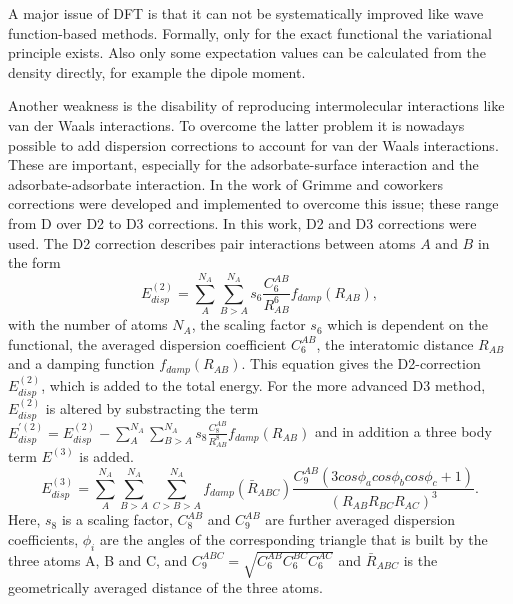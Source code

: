 \documentclass[11pt,DIV=13,BCOR=5mm,a4paper,headinclude]{scrbook}
\begin{document}
A major issue of DFT is that it can not be systematically improved like wave function-based methods.
Formally, only for the exact functional the variational principle exists.
Also only some expectation values can be calculated from the density directly, for example the dipole moment. %


Another weakness is the disability of reproducing intermolecular interactions like van der Waals interactions.
To overcome the latter problem it is nowadays possible to add dispersion corrections to account for van der Waals interactions.
These are important, especially for the adsorbate-surface interaction and the adsorbate-adsorbate interaction.
In the work of Grimme\cite{grimme06} and coworkers corrections were developed and implemented to overcome this issue; these range from D over D2 to D3 corrections.
In this work, D2 and D3 corrections were used.
The D2 correction describes pair interactions between atoms $A$ and $B$ in the form
\begin{equation}\label{eq:d2}
 E_{disp}^{(2)} =\sum\limits_{A}^{N_A}\sum\limits_{B>A}^{N_A} s_6 \frac{C_6^{AB}}{R_{AB}^6}f_{damp}(R_{AB}),
\end{equation}
with the number of atoms $N_A$, the scaling factor $s_6$ which is dependent on the functional, the averaged dispersion coefficient $C^{AB}_6$, the interatomic distance $R_{AB}$ and a damping function $f_{damp}(R_{AB})$.
This equation gives the D2-correction $E_{disp}^{(2)}$, which is added to the total energy.
For the more advanced D3 method, $E_{disp}^{(2)}$ is altered by substracting the term $E_{disp}^{\prime(2)}=E_{disp}^{(2)} -\sum\limits_{A}^{N_A}\sum\limits_{B>A}^{N_A} s_8 \frac{C_8^{AB}}{R_{AB}^8}f_{damp}(R_{AB})$ and in addition a three body term $E^{(3)}$ is added.
\begin{equation}
  E_{disp}^{(3)} =\sum\limits_{A}^{N_A}\sum\limits_{B>A}^{N_A}\sum\limits_{C>B>A}^{N_A} f_{damp}(\bar{R}_{ABC}) \frac{C_9^{AB}(3cos\phi_a cos\phi_b cos\phi_c+1)}{(R_{AB}R_{BC}R_{AC})^3}.
\end{equation}
Here, $s_8$ is a scaling factor, $C_8^{AB}$ and $C_9^{AB}$ are further averaged dispersion coefficients, $\phi_i$ are the angles of the corresponding triangle that is built by the three atoms A, B and C, and $C_9^{ABC}=\sqrt{C_6^{AB}C_6^{BC}C_6^{AC}}$ and $\bar{R}_{ABC}$ is the geometrically averaged distance of the three atoms.
\end{document}
